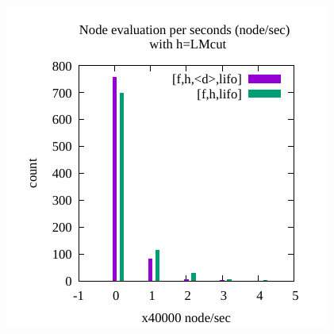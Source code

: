 \begin{figure}[htbp]
 \centering
 \includegraphics{img/node-sec/lmhiL-lmh_L-hist.pdf}

\end{figure}
